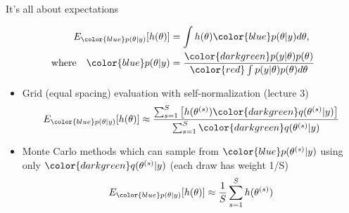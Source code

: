 \documentclass[english,t]{beamer}
\begin{document}
\begin{frame}{It's all about expectations}

  \vspace{-1.5\baselineskip}
   \begin{align*}
     E_{\color{blue} p(\theta|y)}[h(\theta)] & = \int h(\theta) {\color{blue} p(\theta|y)} d\theta,\\
     \text{where} \quad
     {\color{blue} p(\theta|y)} & = \frac{\color{darkgreen}p(y|\theta)p(\theta)}{\color{red} \int p(y|\theta)p(\theta) d\theta}
   \end{align*}

 \begin{itemize}
   \vspace{-0.5\baselineskip}
    \item<4-> Grid (equal spacing) evaluation with self-normalization {\small(lecture 3)}
      \begin{align*}
        E_{\color{blue} p(\theta|y)}[h(\theta)] \approx
        \frac{\sum_{s=1}^S \left[h(\theta^{(s)}){\color{darkgreen}q(\theta^{(s)}|y)}\right]}{\sum_{s=1}^S{\color{darkgreen}q(\theta^{(s)}|y)}}
      \end{align*}
    \item<5-> Monte Carlo methods which can sample from
      ${\color{blue}p(\theta^{(s)}|y)}$ using only
      ${\color{darkgreen}q(\theta^{(s)}|y)}$ {\color{gray}(each draw has weight 1/S)}
         \vspace{-0.5\baselineskip}
      \begin{align*}
        E_{\color{blue} p(\theta|y)}[h(\theta)] \approx \frac{1}{S} \sum_{s=1}^S h(\theta^{(s)})
      \end{align*}
    \end{itemize}
   
\end{frame}
\end{document}

